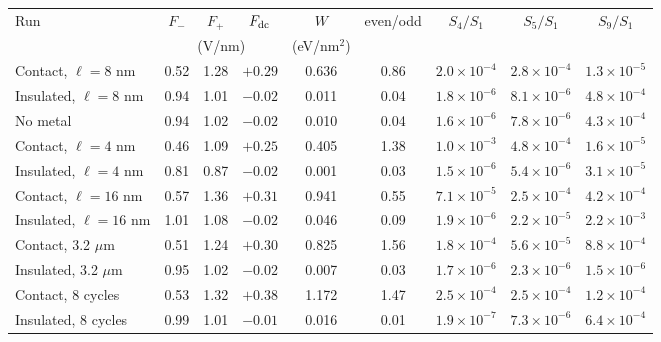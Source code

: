\begin{tabular}{lcccccccc}
\hline\hline
Run & $F_-$ & $F_+$ & $F_{\rm dc}$ & $W$ & even/odd & $S_4/S_1$ & $S_5/S_1$ & $S_9/S_1$ \\
 & \multicolumn{3}{c}{(V/nm)} & (eV/nm$^2$) & & & & \\
\hline
Contact, $\ell=8$ nm & 0.52 & 1.28 & $+0.29$ & 0.636 & 0.86 & $2.0\times10^{-4}$ & $2.8\times10^{-4}$ & $1.3\times10^{-5}$ \\
Insulated, $\ell=8$ nm & 0.94 & 1.01 & $-0.02$ & 0.011 & 0.04 & $1.8\times10^{-6}$ & $8.1\times10^{-6}$ & $4.8\times10^{-4}$ \\
No metal & 0.94 & 1.02 & $-0.02$ & 0.010 & 0.04 & $1.6\times10^{-6}$ & $7.8\times10^{-6}$ & $4.3\times10^{-4}$ \\
\hline
Contact, $\ell=4$ nm & 0.46 & 1.09 & $+0.25$ & 0.405 & 1.38 & $1.0\times10^{-3}$ & $4.8\times10^{-4}$ & $1.6\times10^{-5}$ \\
Insulated, $\ell=4$ nm & 0.81 & 0.87 & $-0.02$ & 0.001 & 0.03 & $1.5\times10^{-6}$ & $5.4\times10^{-6}$ & $3.1\times10^{-5}$ \\
Contact, $\ell=16$ nm & 0.57 & 1.36 & $+0.31$ & 0.941 & 0.55 & $7.1\times10^{-5}$ & $2.5\times10^{-4}$ & $4.2\times10^{-4}$ \\
Insulated, $\ell=16$ nm & 1.01 & 1.08 & $-0.02$ & 0.046 & 0.09 & $1.9\times10^{-6}$ & $2.2\times10^{-5}$ & $2.2\times10^{-3}$ \\
\hline
Contact, 3.2 $\mu$m & 0.51 & 1.24 & $+0.30$ & 0.825 & 1.56 & $1.8\times10^{-4}$ & $5.6\times10^{-5}$ & $8.8\times10^{-4}$ \\
Insulated, 3.2 $\mu$m & 0.95 & 1.02 & $-0.02$ & 0.007 & 0.03 & $1.7\times10^{-6}$ & $2.3\times10^{-6}$ & $1.5\times10^{-6}$ \\
\hline
Contact, 8 cycles & 0.53 & 1.32 & $+0.38$ & 1.172 & 1.47 & $2.5\times10^{-4}$ & $2.5\times10^{-4}$ & $1.2\times10^{-4}$ \\
Insulated, 8 cycles & 0.99 & 1.01 & $-0.01$ & 0.016 & 0.01 & $1.9\times10^{-7}$ & $7.3\times10^{-6}$ & $6.4\times10^{-4}$ \\
\hline\hline
\end{tabular}
